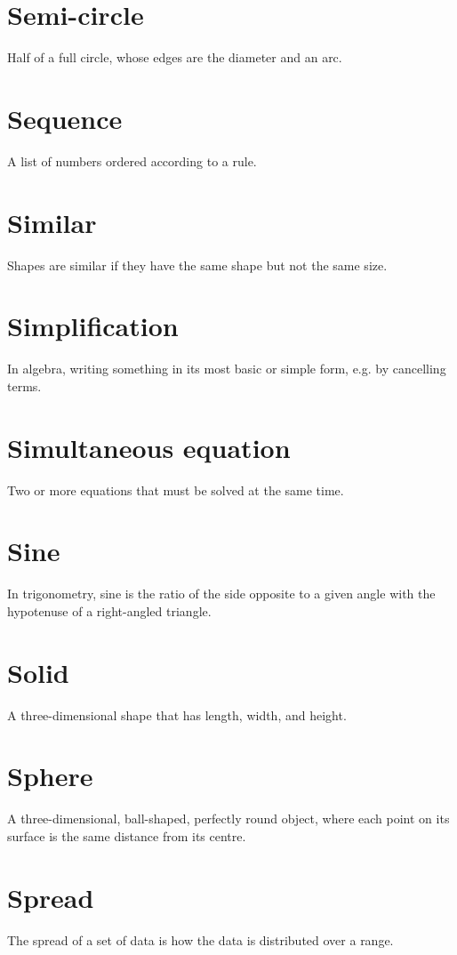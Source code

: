 \documentclass[10pt]{article}
\begin{document}
\section*{Semi-circle}
Half of a full circle, whose edges are the diameter and an arc.

\section*{Sequence}
A list of numbers ordered according to a rule.

\section*{Similar}
Shapes are similar if they have the same shape but not the same size.

\section*{Simplification}
In algebra, writing something in its most basic or simple form, e.g. by cancelling terms.

\section*{Simultaneous equation}
Two or more equations that must be solved at the same time.

\section*{Sine}
In trigonometry, sine is the ratio of the side opposite to a given angle with the hypotenuse of a right-angled triangle.

\section*{Solid}
A three-dimensional shape that has length, width, and height.

\section*{Sphere}
A three-dimensional, ball-shaped, perfectly round object, where each point on its surface is the same distance from its centre.

\section*{Spread}
The spread of a set of data is how the data is distributed over a range.
\end{document}
